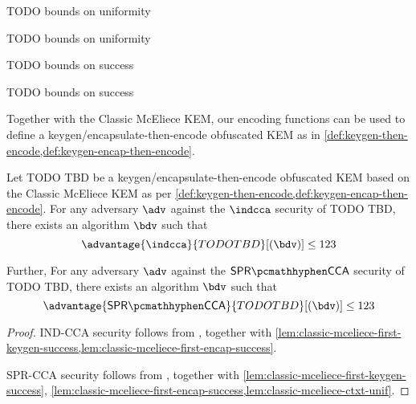 \begin{lemma} \label{lem:classic-mceliece-pk-unif}
    TODO bounds on uniformity
\end{lemma}

\begin{lemma} \label{lem:classic-mceliece-ctxt-unif}
    TODO bounds on uniformity
\end{lemma}

\begin{lemma} \label{lem:classic-mceliece-first-keygen-success}
    TODO bounds on success
\end{lemma}

\begin{lemma}[[First-encap success probability of TODO TBD] \label{lem:classic-mceliece-first-encap-success}
    TODO bounds on success
\end{lemma}

Together with the Classic McEliece KEM, our encoding functions can be used to define a keygen/encapsulate-then-encode obfuscated KEM as in \cref{def:keygen-then-encode,def:keygen-encap-then-encode}.

\begin{theorem}
    Let TODO TBD be a keygen/encapsulate-then-encode obfuscated KEM based on the Classic McEliece KEM as per \cref{def:keygen-then-encode,def:keygen-encap-then-encode}. For any adversary $\adv$ against the $\indcca$ security of TODO TBD, there exists an algorithm $\bdv$ such that
    \[ \advantage{\indcca}{TODO TBD}[(\bdv)] \leq 123 \]

    Further,  For any adversary $\adv$ against the $\sprcca$ security of TODO TBD, there exists an algorithm $\bdv$ such that
    \[ \advantage{\sprcca}{TODO TBD}[(\bdv)] \leq 123 \]
\end{theorem}
\begin{proof}
    IND-CCA security follows from \cite[Theorem~2.12]{CCS:GunSteVei24}, together with \cref{lem:classic-mceliece-first-keygen-success,lem:classic-mceliece-first-encap-success}.
    
    SPR-CCA security follows from \cite[Theorem~2.13]{CCS:GunSteVei24}, together with \cref{lem:classic-mceliece-first-keygen-success}, \ref{lem:classic-mceliece-first-encap-success,lem:classic-mceliece-ctxt-unif}.
\end{proof}